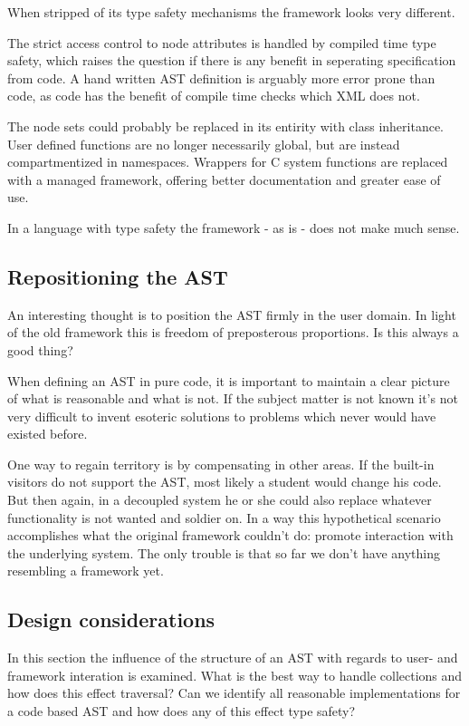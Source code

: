 \documentclass[final,a4paper,12pt]{article}
\begin{document}
When stripped of its type safety mechanisms the framework looks very different.

The strict access control to node attributes is handled by compiled time type safety, which raises the question if there is any benefit in seperating specification from code. A hand written AST definition is arguably more error prone than code, as code has the benefit of compile time checks which XML does not.

The node sets could probably be replaced in its entirity with class inheritance. User defined functions are no longer necessarily global, but are instead compartmentized in namespaces. Wrappers for C system functions are replaced with a managed framework, offering better documentation and greater ease of use.

In a language with type safety the framework - as is - does not make much sense.

\subsection{Repositioning the AST}
An interesting thought is to position the AST firmly in the user domain. In light of the old framework this is freedom of preposterous proportions. Is this always a good thing?

When defining an AST in pure code, it is important to maintain a clear picture of what is reasonable and what is not. If the subject matter is not known it's not very difficult to invent esoteric solutions to problems which never would have existed before.

One way to regain territory is by compensating in other areas. If the built-in visitors do not support the AST, most likely a student would change his code. But then again, in a decoupled system he or she could also replace whatever functionality is not wanted and soldier on. In a way this hypothetical scenario accomplishes what the original framework couldn't do: promote interaction with the underlying system. The only trouble is that so far we don't have anything resembling a framework yet.

\subsection{Design considerations}
In this section the influence of the structure of an AST with regards to user- and framework interation is examined. What is the best way to handle collections and how does this effect traversal? Can we identify all reasonable implementations for a code based AST and how does any of this effect type safety?
\end{document}
